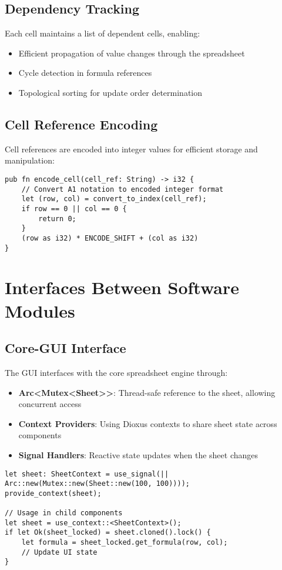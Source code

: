 \documentclass[12pt]{article}
\begin{document}
\subsection{Dependency Tracking}
Each cell maintains a list of dependent cells, enabling:
\begin{itemize}
    \item Efficient propagation of value changes through the spreadsheet
    \item Cycle detection in formula references
    \item Topological sorting for update order determination
\end{itemize}

\subsection{Cell Reference Encoding}
Cell references are encoded into integer values for efficient storage and manipulation:
\begin{lstlisting}[caption={Cell reference encoding}]
pub fn encode_cell(cell_ref: String) -> i32 {
    // Convert A1 notation to encoded integer format
    let (row, col) = convert_to_index(cell_ref);
    if row == 0 || col == 0 {
        return 0;
    }
    (row as i32) * ENCODE_SHIFT + (col as i32)
}
\end{lstlisting}

\section{Interfaces Between Software Modules}

\subsection{Core-GUI Interface}
The GUI interfaces with the core spreadsheet engine through:
\begin{itemize}
    \item \textbf{Arc<Mutex<Sheet>>}: Thread-safe reference to the sheet, allowing concurrent access
    \item \textbf{Context Providers}: Using Dioxus contexts to share sheet state across components
    \item \textbf{Signal Handlers}: Reactive state updates when the sheet changes
\end{itemize}

\begin{lstlisting}[caption={Core-GUI interface in spreadsheet component}]
let sheet: SheetContext = use_signal(|| Arc::new(Mutex::new(Sheet::new(100, 100))));
provide_context(sheet);

// Usage in child components
let sheet = use_context::<SheetContext>();
if let Ok(sheet_locked) = sheet.cloned().lock() {
    let formula = sheet_locked.get_formula(row, col);
    // Update UI state
}
\end{lstlisting}
\end{document}
